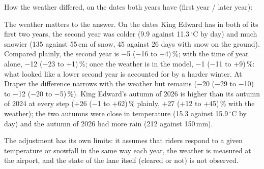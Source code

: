 \documentclass[11pt,a4paper]{article}
\begin{document}
How the weather differed, on the dates both years have (first year / later year):
\begin{center}\footnotesize{}\end{center}
The weather matters to the answer. On the dates King Edward has in both of its first two years, the second year was colder (9.9 against 11.3\,$^\circ$C by day) and much snowier (135 against 55\,cm of snow, 45 against 26 days with snow on the ground). Compared plainly, the second year is $-$5 ($-$16 to +4)\,\%; with the time of year alone, $-$12 ($-$23 to +1)\,\%; once the weather is in the model, $-$1 ($-$11 to +9)\,\%: what looked like a lower second year is accounted for by a harder winter. At Draper the difference narrows with the weather but remains ($-$20 ($-$29 to $-$10) to $-$12 ($-$20 to $-$5)\,\%). King Edward\textquoteright{}s autumn of 2026 is higher than its autumn of 2024 at every step (+26 ($-$1 to +62)\,\% plainly, +27 (+12 to +45)\,\% with the weather); the two autumns were close in temperature (15.3 against 15.9\,$^\circ$C by day) and the autumn of 2026 had more rain (212 against 150\,mm).

The adjustment has its own limits: it assumes that riders respond to a given temperature or snowfall in the same way each year, the weather is measured at the airport, and the state of the lane itself (cleared or not) is not observed.
\end{document}
